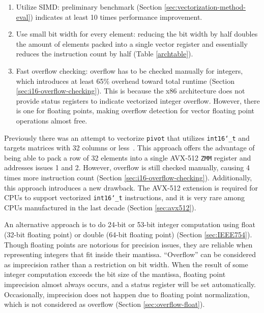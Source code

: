 \documentclass[logo,bsc,singlespacing,parskip]{infthesis}
\newcommand{\dtshort}{\texttt{int16\char`_t}}
\newcommand{\zmm}{\texttt{ZMM}}
\begin{document}
\begin{enumerate}

\item Utilize SIMD: preliminary benchmark (Section \ref{sec:vectorization-method-eval}) indicates at least 10 times
performance improvement. 

\item Use small bit width for every element: reducing the bit width by half doubles the amount of elements packed into a single vector register and essentially reduces the instruction count by half (Table \ref{archtable}). 

\item Fast overflow checking: overflow has to be checked manually for integers, which introduces at least 65\% overhead toward total runtime (Section \ref{sec:i16-overflow-checking}). This is because the x86 architecture does not provide status registers to indicate vectorized integer overflow. However, there is one for floating points, making overflow detection for vector floating point operations almost free. 

\end{enumerate}


Previously there was an attempt to vectorize \texttt{pivot} that utilizes \dtshort{} and targets matrices with 32 columns or less~\cite{FPL2}. This approach offers the advantage of being able to pack a row of 32 elements into a single AVX-512 \zmm{} register and addresses issues 1 and 2. However, overflow is still checked manually, causing 4 times more instruction count (Section \ref{sec:i16-overflow-checking}). Additionally, this approach introduces a new drawback. The AVX-512 extension is required for CPUs to support vectorized \dtshort{} instructions, and it is very rare among CPUs manufactured in the last decade (Section \ref{sec:avx512}). 

An alternative approach is to do 24-bit or 53-bit integer computation using float (32-bit floating point) or double (64-bit floating point) (Section \ref{sec:IEEE754}). Though floating points are notorious for precision issues, they are reliable when representing integers that fit inside their mantissa. ``Overflow'' can be considered as imprecision rather than a restriction on bit width. When the result of some integer computation exceeds the bit size of the mantissa, floating point imprecision almost always occurs, and a status register will be set automatically. Occasionally, imprecision does not happen due to floating point normalization, which is not considered as overflow  (Section \ref{sec:overflow-float}).
\end{document}
